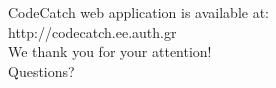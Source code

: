 \documentclass[compress]{beamer}
\begin{document}
\begin{frame}

\begin{center}
CodeCatch web application is available at:\\
{\Medium http://codecatch.ee.auth.gr}\\
\vfill
We thank you for your attention!\\
Questions?\\


\end{center}
\end{frame}
\end{document}
